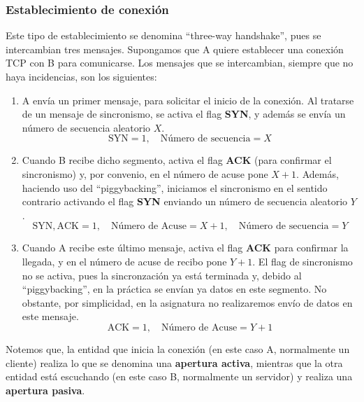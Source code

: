 \subsubsection{Establecimiento de conexión}
Este tipo de establecimiento se denomina ``three-way handshake'', pues se intercambian tres mensajes. Supongamos que A quiere establecer una conexión \acrshort{TCP} con B para comunicarse. Los mensajes que se intercambian, siempre que no haya incidencias, son los siguientes:
\begin{enumerate}
    \item A envía un primer mensaje, para solicitar el inicio de la conexión. Al tratarse de un mensaje de sincronismo, se activa el flag \textbf{SYN}, y además se envía un número de secuencia aleatorio $X$.
    \begin{equation*}
        \text{SYN} = 1, \quad \text{Número de secuencia} = X
    \end{equation*}

    \item Cuando B recibe dicho segmento, activa el flag \textbf{ACK} (para confirmar el sincronismo) y, por convenio, en el número de acuse pone $X+1$. Además, haciendo uso del ``piggybacking'', iniciamos el sincronismo en el sentido contrario activando el flag \textbf{SYN} enviando un número de secuencia aleatorio $Y$.
    \begin{equation*}
        \text{SYN},\text{ACK} = 1, \quad \text{Número de Acuse} = X+1,\quad \text{Número de secuencia} = Y
    \end{equation*}

    \item Cuando A recibe este último mensaje, activa el flag \textbf{ACK} para confirmar la llegada, y en el número de acuse de recibo pone $Y+1$. El flag de sincronismo no se activa, pues la sincronzación ya está terminada y, debido al ``piggybacking'', en la práctica se envían ya datos en este segmento.
    No obstante, por simplicidad, en la asignatura no realizaremos envío de datos en este mensaje.
    \begin{equation*}
        \text{ACK} = 1, \quad \text{Número de Acuse} = Y+1
    \end{equation*}
\end{enumerate}

Notemos que, la entidad que inicia la conexión (en este caso A, normalmente un cliente) realiza lo que se denomina una \textbf{apertura activa}, mientras que la otra entidad está escuchando (en este caso B, normalmente un servidor) y realiza una \textbf{apertura pasiva}.

